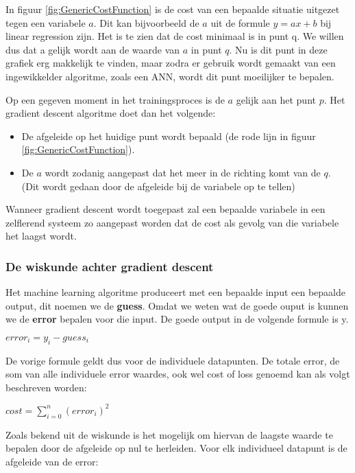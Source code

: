 In figuur \ref{fig:GenericCostFunction} is de cost van een bepaalde situatie uitgezet tegen een variabele $a$. Dit kan bijvoorbeeld de $a$ uit de formule $ y = ax + b $ bij linear regression zijn.  Het is te zien dat de cost minimaal is in punt q. We willen dus dat a gelijk wordt aan de waarde van $a$ in punt $q$. Nu is dit punt in deze grafiek erg makkelijk te vinden, maar zodra er gebruik wordt gemaakt van een ingewikkelder algoritme, zoals een ANN, wordt dit punt moeilijker te bepalen.

Op een gegeven moment in het trainingsproces is de $a$ gelijk aan het punt $p$. Het gradient descent algoritme doet dan het volgende:
\begin{itemize}
\item De afgeleide op het huidige punt wordt bepaald (de rode lijn in figuur \ref{fig:GenericCostFunction}).
\item De $a$ wordt zodanig aangepast dat het meer in de richting komt van de $q$. (Dit wordt gedaan door de afgeleide bij de variabele op te tellen)
\end{itemize}

Wanneer gradient descent wordt toegepast zal een bepaalde variabele in een zelflerend systeem zo aangepast worden dat de cost als gevolg van die variabele het laagst wordt. 

\subsubsection{De wiskunde achter gradient descent}
Het machine learning algoritme produceert met een bepaalde input een bepaalde output, dit noemen we de \textbf{guess}. Omdat we weten wat de goede ouput is kunnen we de \textbf{error} bepalen voor die input. De goede output in de volgende formule is y.

\begin{center}
$ error_{i} = y_{i} - guess_{i}$
\end{center} 

De vorige formule geldt dus voor de individuele datapunten. De totale error, de som van alle individuele error waardes, ook wel cost of loss genoemd kan als volgt beschreven worden:

\begin{center}
$ cost = \sum_{i=0}^n(error_i)^2$
\end{center}

Zoals bekend uit de wiskunde is het mogelijk om hiervan de laagste waarde te bepalen door de afgeleide op nul te herleiden. Voor elk individueel datapunt is de afgeleide van de error:

